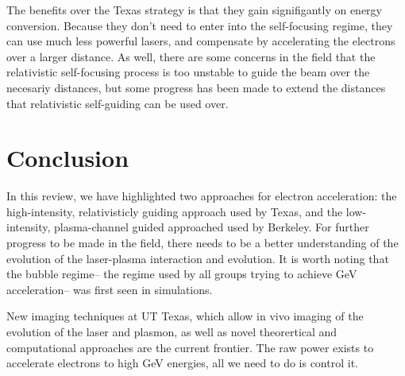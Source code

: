 \documentclass[12pt,letter]{article}
\begin{document}
The benefits over the Texas strategy is that they gain signifigantly on energy
conversion. Because they don't need to enter into the self-focusing regime,
they can use much less powerful lasers, and compensate by accelerating the
electrons over a larger distance. As well, there are some concerns in the field
that the relativistic self-focusing process is too unstable to guide the beam
over the necesariy distances\cite{RevModPhys.81.1229}, but some progress has
been made to extend the distances that relativistic self-guiding can be used
over\cite{PhysRevLett.113.245001}.


\section{Conclusion}
In this review, we have highlighted two approaches for electron acceleration:
the high-intensity, relativisticly guiding approach used by Texas, and the
low-intensity, plasma-channel guided approached used by Berkeley. For further
progress to be made in the field, there needs to be a better understanding of
the evolution of the laser-plasma interaction and evolution. It is worth noting
that the bubble regime-- the regime used by all groups trying to achieve GeV
acceleration-- was first seen in simulations. 

New imaging techniques at UT Texas, which allow in vivo imaging of the evolution
of the laser and plasmon, as well as novel theorertical and computational
approaches are the current frontier. The raw power exists to accelerate
electrons to high GeV energies, all we need to do is control it.

\end{document}
